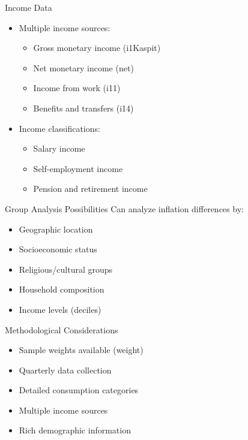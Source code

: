 \documentclass{beamer}
\begin{document}
\begin{frame}{Income Data}
    \begin{itemize}
        \item Multiple income sources:
              \begin{itemize}
                  \item Gross monetary income (i1Kaspit)
                  \item Net monetary income (net)
                  \item Income from work (i11)
                  \item Benefits and transfers (i14)
              \end{itemize}
        \item Income classifications:
              \begin{itemize}
                  \item Salary income
                  \item Self-employment income
                  \item Pension and retirement income
              \end{itemize}
    \end{itemize}
\end{frame}

\begin{frame}{Group Analysis Possibilities}
    Can analyze inflation differences by:
    \begin{itemize}
        \item Geographic location
        \item Socioeconomic status
        \item Religious/cultural groups
        \item Household composition
        \item Income levels (deciles)
    \end{itemize}
\end{frame}

\begin{frame}{Methodological Considerations}
    \begin{itemize}
        \item Sample weights available (weight)
        \item Quarterly data collection
        \item Detailed consumption categories
        \item Multiple income sources
        \item Rich demographic information
    \end{itemize}
\end{frame}
\end{document}
